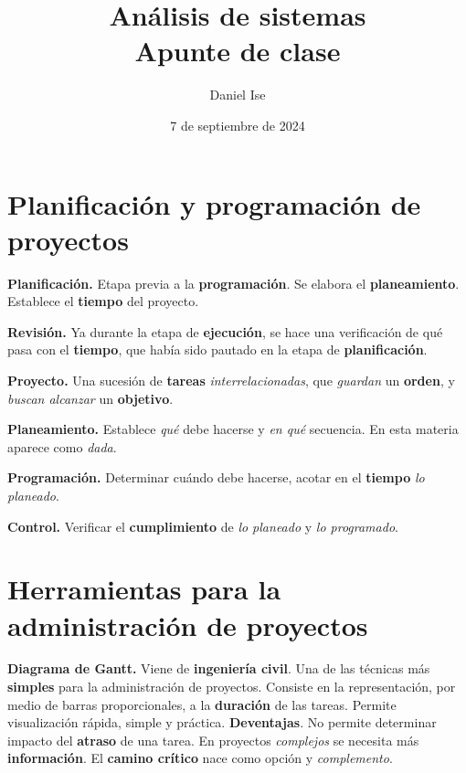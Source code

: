 \documentclass{article}
\title{Análisis de sistemas\\Apunte de clase}
\author{Daniel Ise}
\date{7 de septiembre de 2024}
\begin{document}
\maketitle

\tableofcontents

\section{Planificación y programación de proyectos}

\textbf{Planificación.}
Etapa previa a la \textbf{programación}.
Se elabora el \textbf{planeamiento}.
Establece el \textbf{tiempo} del proyecto.

\textbf{Revisión.}
Ya durante la etapa de \textbf{ejecución},
se hace una verificación de qué pasa con el \textbf{tiempo},
que había sido pautado en la etapa de \textbf{planificación}.

\textbf{Proyecto.}
Una sucesión de \textbf{tareas} \textit{interrelacionadas},
que \textit{guardan} un \textbf{orden},
y \textit{buscan alcanzar} un \textbf{objetivo}.

\textbf{Planeamiento.}
Establece \textit{qué} debe hacerse
y \textit{en qué} secuencia.
En esta materia aparece como \textit{dada}.

\textbf{Programación.}
Determinar cuándo debe hacerse,
acotar en el \textbf{tiempo} \textit{lo planeado}.

\textbf{Control.}
Verificar el \textbf{cumplimiento} de
\textit{lo planeado}
y \textit{lo programado}.

\section{Herramientas para la administración de proyectos}

\textbf{Diagrama de Gantt.}
Viene de \textbf{ingeniería civil}.
Una de las técnicas más \textbf{simples} para la administración de proyectos.
Consiste en la representación, por medio de barras proporcionales,
a la \textbf{duración} de las tareas.
Permite visualización rápida, simple y práctica.
\textbf{Deventajas}.
No permite determinar impacto del \textbf{atraso} de una tarea.
En proyectos \textit{complejos} se necesita más \textbf{información}.
El \textbf{camino crítico} nace como opción y \textit{complemento}.
\end{document}
